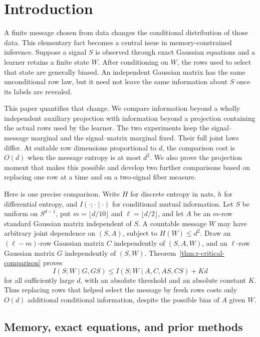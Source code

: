 \section{Introduction}\label{sec:r-introduction}

A finite message chosen from data changes the conditional distribution
of those data.  This elementary fact becomes a central issue in
memory-constrained inference.  Suppose a signal \(S\) is observed
through exact Gaussian equations and a learner retains a finite state
\(W\).  After conditioning on \(W\), the rows used to select that
state are generally biased.  An independent Gaussian matrix has the
same unconditional row law, but it need not leave the same information
about \(S\) once its labels are revealed.

This paper quantifies that change.  We compare information beyond a
wholly independent auxiliary projection with information beyond a
projection containing the actual rows used by the learner.  The two
experiments keep the signal--message marginal and the signal--matrix
marginal fixed.  Their full joint laws differ.  At suitable row
dimensions proportional to \(d\), the comparison cost is \(O(d)\)
when the message entropy is at most \(d^2\).  We also prove the
projection moment that makes this possible and develop two further
comparisons based on replacing one row at a time and on a
two-signal fiber measure.

Here is one precise comparison.  Write \(H\) for discrete entropy
in nats, \(h\) for differential entropy, and
\(I(\cdot;\cdot\mid\cdot)\) for conditional mutual
information.  Let \(S\) be uniform on \(S^{d-1}\), put
\(m=\lfloor d/10\rfloor\) and \(\ell=\lfloor d/2\rfloor\), and
let \(A\) be an \(m\)-row standard Gaussian matrix independent of
\(S\).  A countable message \(W\) may have arbitrary joint
dependence on \((S,A)\), subject to \(H(W)\le d^2\).
Draw an \((\ell-m)\)-row Gaussian matrix \(C\) independently of
\((S,A,W)\), and an \(\ell\)-row Gaussian matrix \(G\) independently of
\((S,W)\).  Theorem~\ref{thm:r-critical-comparison} proves
\[
 I(S;W\mid G,GS)
 \le I(S;W\mid A,C,AS,CS)+Kd
\]
for all sufficiently large \(d\), with an absolute threshold and
an absolute constant \(K\).  Thus replacing rows that helped select
the message by fresh rows costs only \(O(d)\) additional conditional
information, despite the possible bias of \(A\) given \(W\).

\subsection*{Memory, exact equations, and prior methods}


